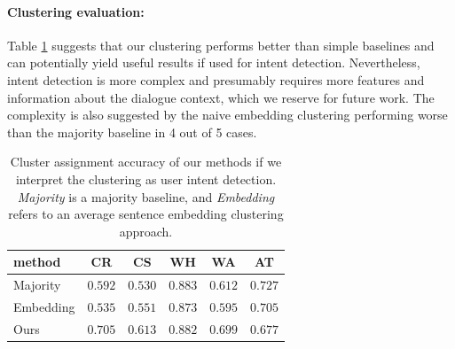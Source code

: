 \paragraph{Clustering evaluation:} 
Table \ref{table:intentclust} suggests that our clustering performs better than simple baselines and can potentially yield useful results if used for intent detection.
Nevertheless, intent detection is more complex and presumably requires more features and information about the dialogue context, which we reserve for future work.
The complexity is also suggested by the naive embedding clustering performing worse than the majority baseline in 4 out of 5 cases.
\begin{table}[tp]
    \centering
    \small
    \begin{tabular}{lccccc}
    \hline
     \textbf{method} & \textbf{CR} & \textbf{CS} & \textbf{WH} & \textbf{WA} & \textbf{AT} \\
     \hline
     Majority & $0.592$ & $0.530$ & $0.883$ & $0.612$ & $\pmb{0.727}$ \\
     Embedding & $0.535$ & $0.551$ & $0.873$ & $0.595$ & $0.705$ \\
     Ours & $\pmb{0.705}$ & $\pmb{0.613}$ & $\pmb{0.882}$ & $\pmb{0.699}$ & $0.677$ \\
     \hline
    \end{tabular}
    
    \caption{Cluster assignment accuracy of our methods if we interpret the clustering as user intent detection. \textit{Majority} is a majority baseline, and \textit{Embedding} refers to an average sentence embedding clustering approach.
    }
    \label{table:intentclust}
\end{table}


